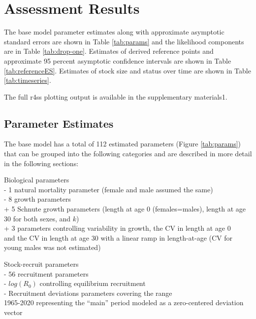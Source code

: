 \documentclass[11pt,
  english,
  a4paper,
]{article}
\begin{document}

\hypertarget{assessment-results}{%
\section{Assessment Results}\label{assessment-results}}

\leavevmode\tagmcend\tagstructend

The base model parameter estimates along with approximate asymptotic standard errors are shown in Table \ref{tab:params} and the likelihood components are in Table \ref{tab:drop-one}. Estimates of derived reference points and approximate 95 percent asymptotic confidence intervals are shown in Table \ref{tab:referenceES}. Estimates of stock size and status over time are shown in Table \ref{tab:timeseries}.

The full r4ss plotting output is available in the supplementary materials1.


\hypertarget{parameter-estimates}{%
\subsection{Parameter Estimates}\label{parameter-estimates}}

\leavevmode\tagmcend\tagstructend

The base model has a total of 112 estimated parameters (Figure \ref{tab:params}) that can be grouped into the following categories and are described in more detail in the following sections:

Biological parameters\\
- 1 natural mortality parameter (female and male assumed the same)\\
- 8 growth parameters\\
+ 5 Schnute growth parameters (length at age 0 (females=males), length at age 30 for both sexes, and {\(k\)\leavevmode\tagmcend\tagstructend})\\
+ 3 parameters controlling variability in growth, the CV in length at age 0\\
and the CV in length at age 30 with a linear ramp in length-at-age (CV for young males was not estimated)

Stock-recruit parameters\\
- 56 recruitment parameters\\
- {\(log(R_0)\)\leavevmode\tagmcend\tagstructend} controlling equilibrium recruitment\\
- Recruitment deviations parameters covering the range\\
1965-2020 representing the ``main'' period modeled as a zero-centered deviation vector
\end{document}
